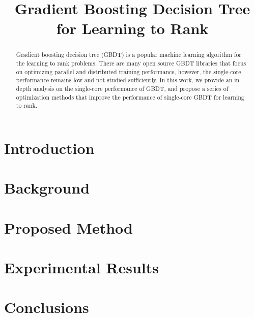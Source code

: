 \documentclass[letterpaper]{article}
\title{Gradient Boosting Decision Tree for Learning to Rank}
\newcommand{\mypar}[1]{{\bf #1.}}
\begin{document}
%
\maketitle
%

\begin{abstract}
Gradient boosting decision tree (GBDT) is a popular machine learning algorithm for the learning to rank problems. There are many open source GBDT libraries that focus on optimizing parallel and distributed training performance, however, the single-core performance remains low and not studied sufficiently. In this work, we provide an in-depth analysis on the single-core performance of GBDT, and propose a series of optimization methods that improve the performance of single-core GBDT for learning to rank.

\end{abstract}

\section{Introduction}\label{sec:intro}


\section{Background}\label{sec:background}


\section{Proposed Method}\label{sec:yourmethod}


\section{Experimental Results}\label{sec:exp}


\section{Conclusions}




\end{document}
